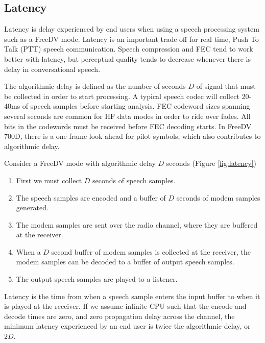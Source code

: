 \documentclass{article}
\begin{document}
\subsection{Latency}

Latency is delay experienced by end users when using a speech processing system such as a FreeDV mode. Latency is an important trade off for real time, Push To Talk (PTT) speech communication. Speech compression and FEC tend to work better with latency, but perceptual quality tends to decrease whenever there is delay in conversational speech.

The algorithmic delay is defined as the number of seconds $D$ of signal that must be collected in order to start processing. A typical speech codec will collect 20-40ms of speech samples before starting analysis.  FEC codeword sizes spanning several seconds are common for HF data modes in order to ride over fades.  All bits in the codewords must be received before FEC decoding starts.  In FreeDV 700D, there is a one frame look ahead for pilot symbols, which also contributes to algorithmic delay.

Consider a FreeDV mode with algorithmic delay $D$ seconds (Figure \ref{fig:latency})
\begin{enumerate}
\item First we must collect $D$ seconds of speech samples.
\item The speech samples are encoded and a buffer of $D$ seconds of modem samples generated.
\item The modem samples are sent over the radio channel, where they are buffered at the receiver.
\item When a $D$ second buffer of modem samples is collected at the receiver, the modem samples can be decoded to a buffer of output speech samples.
\item The output speech samples are played to a listener.
\end{enumerate}  

Latency is the time from when a speech sample enters the input buffer to when it is played at the receiver. If we assume infinite CPU such that the encode and decode times are zero, and zero propagation delay across the channel, the minimum latency experienced by an end user is twice the algorithmic delay, or $2D$.
\end{document}
